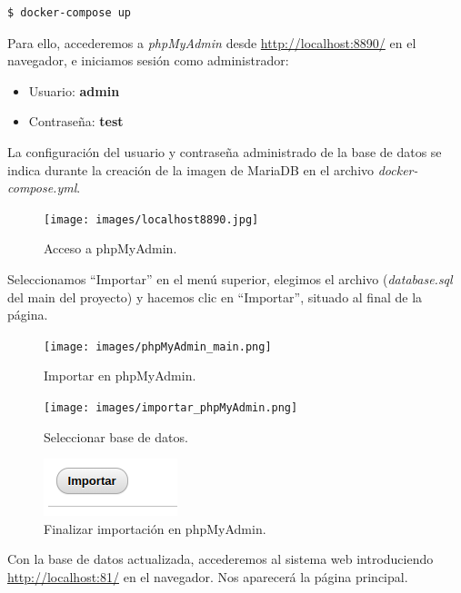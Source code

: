 \documentclass[12pt, twoside]{report}
\begin{document}
\begin{lstlisting}
$ docker-compose up
\end{lstlisting}


Para ello, accederemos a \textit{phpMyAdmin} desde \hyperlink{http://localhost:8890/}{http://localhost:8890/} en el navegador, e iniciamos sesión como administrador:
\begin{itemize}
    \item Usuario: \textbf{admin}
    \item Contraseña: \textbf{test}
\end{itemize}
La configuración del usuario y contraseña administrado de la base de datos se indica durante la creación de la imagen de MariaDB en el archivo \textit{docker-compose.yml}.
\begin{figure}[h]
\begin{center}
\texttt{[image: images/localhost8890.jpg]}
\end{center}
\caption{\label{inicio} Acceso a phpMyAdmin.}
\end{figure}
\newpage
Seleccionamos ``Importar'' en el menú superior, elegimos el archivo (\textit{database.sql} del main del proyecto) y hacemos clic en ``Importar'', situado al final de la página.
\begin{figure}[h]
\begin{center}
\texttt{[image: images/phpMyAdmin\_main.png]}
\end{center}
\caption{\label{inicio} Importar en phpMyAdmin.}
\end{figure}
\begin{figure}[h]
\begin{center}
\texttt{[image: images/importar\_phpMyAdmin.png]}
\end{center}
\caption{\label{inicio} Seleccionar base de datos.}
\end{figure}
\begin{figure}[h]
\begin{center}
\includegraphics[scale=1]{images/botón_importar.png}
\end{center}
\caption{\label{inicio} Finalizar importación en phpMyAdmin.}
\end{figure}
\newpage
Con la base de datos actualizada, accederemos al sistema web introduciendo \hyperlink{http://localhost:81/}{http://localhost:81/} en el navegador. Nos aparecerá la página principal.\\
\end{document}
